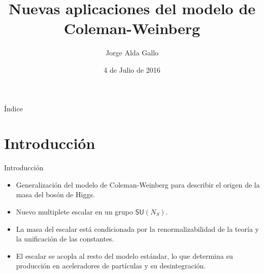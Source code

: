 \documentclass{beamer}
\author{Jorge Alda Gallo}
\title{Nuevas aplicaciones del modelo de Coleman-Weinberg}
\institute{Departamento de Física Teórica I, Universidad Complutense de Madrid}
\date{4 de Julio de 2016}
\begin{document}
\begin{frame}[t, plain]
\titlepage
\end{frame}

\begin{frame}[t]{Índice}
\tableofcontents
\end{frame}

\section{Introducción}
\begin{frame}{Introducción}
\begin{itemize}
\item Generalización del modelo de Coleman-Weinberg para describir el origen de la masa del bosón de Higgs.
\item Nuevo multiplete escalar en un grupo $\mathsf{SU}(N_S)$.
\item La masa del escalar está condicionada por la renormalizabilidad de la teoría y la unificación de las constantes. 
\item El escalar se acopla al resto del modelo estándar, lo que determina su producción en aceleradores de partículas y su desintegración.
\end{itemize}
\end{frame}
\end{document}
